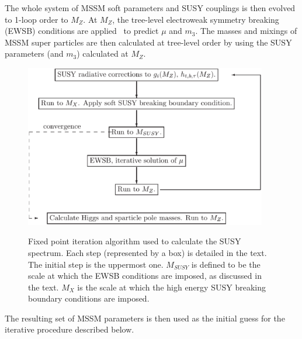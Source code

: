 \documentclass{article}
\begin{document}
The whole system of
MSSM soft parameters and SUSY couplings is then evolved to 1-loop order to
$M_Z$. 
At $M_Z$, the tree-level electroweak symmetry breaking (EWSB) conditions 
are applied~\cite{Allanach:2000ii} to predict $\mu$ and $m_3$.
The masses and mixings of MSSM super particles are then calculated at tree-level
order by using the SUSY  parameters (and $m_3$) calculated at $M_Z$.
\begin{figure}\begin{center}
\label{fig:algorithm}
\includegraphics[width=300pt]{alg.eps}
\caption{Fixed point iteration algorithm used to calculate the SUSY
  spectrum. Each step 
(represented by a box) is detailed in the text. The initial step is the
uppermost one. $M_{SUSY}$ is defined to be the scale at which the EWSB
conditions 
are imposed, as discussed in the text. $M_X$ is the scale at which the high
energy SUSY breaking boundary conditions are imposed.}\end{center}\end{figure}
The resulting set of MSSM parameters is then used as the initial guess for the
iterative procedure described below.
\end{document}
